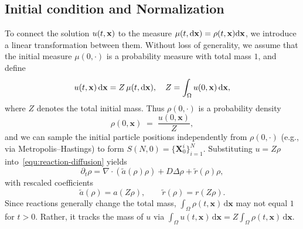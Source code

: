\documentclass[a4paper,fleqn]{cas-sc}
\theoremstyle{definition}
\theoremstyle{remark}
\begin{document}
\subsection{Initial condition and Normalization}
To connect the solution $u(t,\mathbf{x})$ to the measure $\mu(t,\mathrm{d}\mathbf{x})=\rho(t,\mathbf{x}) \mathrm{d} \mathbf{x}$, we introduce a linear transformation between them. 
Without loss of generality, we assume that the initial measure $\mu(0,\cdot)$ is a probability measure with total mass $1$, and define
\begin{equation*}
    u(t,\mathbf{x})\,\mathrm{d}\mathbf{x} = Z \,\mu(t,\mathrm{d}\mathbf{x}), \quad 
Z = \int_{\Omega} u(0,\mathbf{x})\,\mathrm{d}\mathbf{x},
\end{equation*}
where $Z$ denotes the total initial mass.
Thus $\rho(0,\cdot)$ is a probability density
\[
\rho(0,\mathbf{x}) \;=\; \frac{u(0,\mathbf{x})}{Z},
\]
and we can sample the initial particle positions independently from $\rho(0,\cdot)$ (e.g., via Metropolis–Hastings) to form $S(N,0)=\{\mathbf{X}^i_0\}_{i=1}^N$. 
Substituting $u=Z\rho$ into~\eqref{equ:reaction-diffusion}  yields
\begin{equation}\label{equ:normalized_diffusion_reaction}
\partial_t \rho 
= \nabla \cdot \left( \tilde a(\rho)\rho \right)+ D \Delta\rho 
  + \tilde r(\rho)\rho,
\end{equation}
with rescaled coefficients
\[
\tilde a(\rho) = a(Z\rho),  
\qquad \tilde r(\rho) = r(Z\rho).
\]
Since reactions generally change the total mass, $\int_{\Omega}\rho(t,\mathbf{x})\,\mathrm{d}\mathbf{x}$ may not equal $1$ for $t>0$. Rather, it tracks the mass of $u$ via $\int_{\Omega} u(t,\mathbf{x})\,\mathrm{d}\mathbf{x} = Z \int_{\Omega} \rho(t,\mathbf{x})\,\mathrm{d}\mathbf{x}$.
\end{document}
